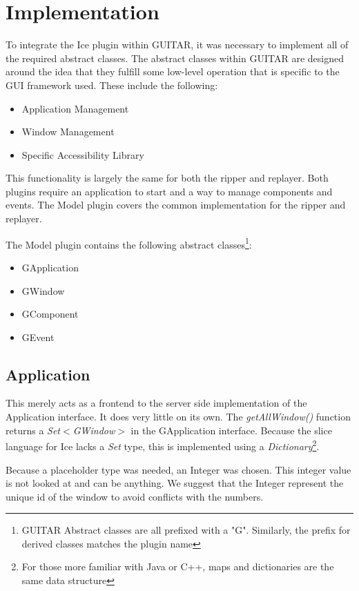 
\section{Implementation}

To integrate the Ice plugin within GUITAR, it was necessary to implement all of the required abstract classes. The abstract classes within GUITAR are designed around the idea that they fulfill some low-level operation that is specific to the GUI framework used. These include the following:

\begin{itemize}
\item Application Management
\item Window Management
\item Specific Accessibility Library
\end{itemize}

This functionality is largely the same for both the ripper and replayer. Both plugins require an application to start and a way to manage components and events. The Model plugin covers the common implementation for the ripper and replayer.

The Model plugin contains the following abstract classes\footnote{GUITAR Abstract classes are all prefixed with a "G". Similarly, the prefix for derived classes matches the plugin name}:

\begin{itemize}
\item GApplication
\item GWindow
\item GComponent
\item GEvent
\end{itemize}

\subsection{Application}

This merely acts as a frontend to the server side implementation of the Application interface. It does very little on its own. The \emph{getAllWindow()} function returns a \emph{Set$<$GWindow$>$} in the GApplication interface. Because the slice language for Ice lacks a \emph{Set} type, this is implemented using a \emph{Dictionary}\footnote{For those more familiar with Java or C++, maps and dictionaries are the same data structure}.

Because a placeholder type was needed, an Integer was chosen. This integer value is not looked at and can be anything. We suggest that the Integer represent the unique id of the window to avoid conflicts with the numbers.

